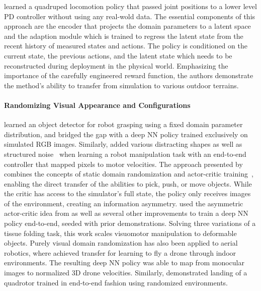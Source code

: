 \documentclass[utf8]{frontiersSCNS} %
\begin{document}
%
\citet{Kumar_Malik_21} learned a quadruped locomotion policy that passed joint positions to a lower level \acs{PD} controller without using any real-wold data.
The essential components of this approach are the encoder that projects the domain parameters to a latent space and the adaption module which is trained to regress the latent state from the recent history of measured states and actions.
The policy is conditioned on the current state, the previous actions, and the latent state which needs to be reconstructed during deployment in the physical world.
Emphasizing the importance of the carefully engineered reward function, the authors demonstrate the method's ability to transfer from simulation to various outdoor terrains.

\paragraph*{Randomizing Visual Appearance and Configurations}
%
\citet{Tobin_Abbeel_17} learned an object detector for robot grasping using a fixed domain parameter distribution, and bridged the gap with a deep \ac{NN} policy trained exclusively on simulated \acs{RGB} images.
Similarly, \citet{James_Johns_17} added various distracting shapes as well as structured noise~\citep{Perlin_02} when learning a robot manipulation task with an end-to-end controller that mapped pixels to motor velocities. %
%
The approach presented by \citet{Pinto_Abbeel_17} combines the concepts of static domain randomization and actor-critic training~\citep{Lillicrap_Wierstra_15}, enabling the direct \simtoreal transfer of the abilities to pick, push, or move objects.
While the critic has access to the simulator's full state, the policy only receives images of the environment, creating an information asymmetry.
\citet{Matas_Davison_18} used the asymmetric actor-critic idea from \citet{Pinto_Abbeel_17} as well as several other improvements to train a deep \ac{NN} policy end-to-end, seeded with prior demonstrations.
Solving three variations of a tissue folding task, this work scales \simtoreal visuomotor manipulation to deformable objects.
%
Purely visual domain randomization has also been applied to aerial robotics, where \citet{Sadeghi_Levine_17} achieved \simtoreal transfer for learning to fly a drone through indoor environments.
The resulting deep \ac{NN} policy was able to map from monocular images to normalized 3D drone velocities.
%
Similarly, \citet{Polvara_Patacchiola_Neumann_20} demonstrated landing of a quadrotor trained in end-to-end fashion using randomized environments.
\end{document}
